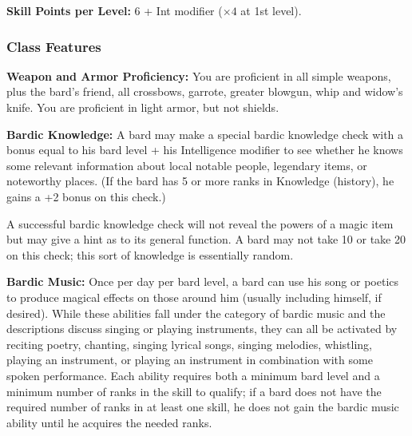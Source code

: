 \textbf{Skill Points per Level:} 6 + Int modifier ($\times4$ at 1st level).

\subsubsection{Class Features}

\textbf{Weapon and Armor Proficiency:} You are proficient in all simple weapons, plus the bard's friend, all crossbows, garrote, greater blowgun, whip and widow's knife. You are proficient in light armor, but not shields.

\textbf{Bardic Knowledge:} A bard may make a special bardic knowledge check with a bonus equal to his bard level + his Intelligence modifier to see whether he knows some relevant information about local notable people, legendary items, or noteworthy places. (If the bard has 5 or more ranks in Knowledge (history), he gains a +2 bonus on this check.)

A successful bardic knowledge check will not reveal the powers of a magic item but may give a hint as to its general function. A bard may not take 10 or take 20 on this check; this sort of knowledge is essentially random.


\textbf{Bardic Music:} Once per day per bard level, a bard can use his song or poetics to produce magical effects on those around him (usually including himself, if desired). While these abilities fall under the category of bardic music and the descriptions discuss singing or playing instruments, they can all be activated by reciting poetry, chanting, singing lyrical songs, singing melodies, whistling, playing an instrument, or playing an instrument in combination with some spoken performance. Each ability requires both a minimum bard level and a minimum number of ranks in the  skill to qualify; if a bard does not have the required number of ranks in at least one  skill, he does not gain the bardic music ability until he acquires the needed ranks.

